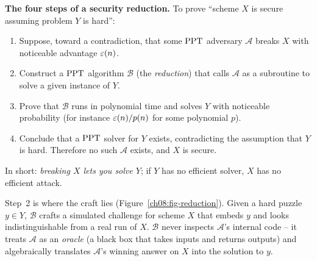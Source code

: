 \begin{focusbox}
\textbf{The four steps of a security reduction.} To prove ``scheme $X$ is secure assuming problem $Y$ is hard'':
\begin{enumerate}
\item Suppose, toward a contradiction, that some $\mathrm{PPT}$ adversary $\mathcal A$ breaks $X$ with noticeable advantage $\varepsilon(n)$.
\item Construct a $\mathrm{PPT}$ algorithm $\mathcal B$ (the \emph{reduction}) that calls $\mathcal A$ as a subroutine to solve a given instance of $Y$.
\item Prove that $\mathcal B$ runs in polynomial time and solves $Y$ with noticeable probability (for instance $\varepsilon(n)/p(n)$ for some polynomial $p$).
\item Conclude that a $\mathrm{PPT}$ solver for $Y$ exists, contradicting the assumption that $Y$ is hard. Therefore no such $\mathcal A$ exists, and $X$ is secure.
\end{enumerate}
In short: \emph{breaking $X$ lets you solve $Y$}; if $Y$ has no efficient solver, $X$ has no efficient attack.
\end{focusbox}

Step~2 is where the craft lies (Figure~\ref{ch08:fig-reduction}). Given a hard puzzle $y \in Y$, $\mathcal B$ crafts a simulated challenge for scheme $X$ that embeds $y$ and looks indistinguishable from a real run of $X$. $\mathcal B$ never inspects $\mathcal A$'s internal code -- it treats $\mathcal A$ as an \emph{oracle} (a black box that takes inputs and returns outputs) and algebraically translates $\mathcal A$'s winning answer on $X$ into the solution to $y$.


